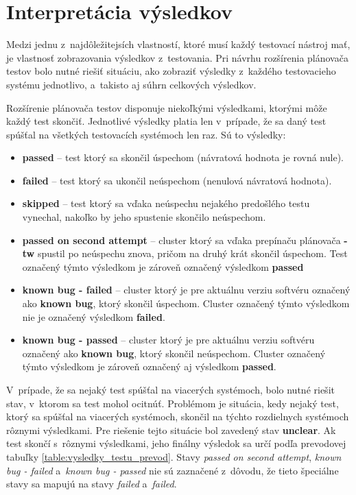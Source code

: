 \section{Interpretácia výsledkov}
\label{sekcia:interpretacia_vysledkov}
Medzi jednu z~najdôležitejsích vlastností, ktoré musí každý testovací nástroj mať, je vlastnosť zobrazovania výsledkov z~testovania.
Pri návrhu rozšírenia plánovača testov bolo nutné riešiť situáciu, ako zobraziť výsledky z~každého testovacieho systému jednotlivo,
a~takisto aj súhrn celkových výsledkov. 

Rozšírenie plánovača testov disponuje niekoľkými výsledkami, ktorými môže každý test skončiť. 
Jednotlivé výsledky platia len v~prípade, že sa daný test spúšťal na všetkých testovacích systémoch len raz. Sú to výsledky:
\begin{itemize}
\item \textbf{passed} -- test ktorý sa skončil úspechom (návratová hodnota je rovná nule).
\item \textbf{failed} -- test ktorý sa ukončil neúspechom (nenulová návratová hodnota).
\item \textbf{skipped} -- test ktorý sa vďaka neúspechu nejakého predošlého testu vynechal, nakoľko by jeho spustenie skončilo neúspechom.
\item \textbf{passed on second attempt} -- cluster ktorý sa vďaka prepínaču plánovača \textbf{-tw} spustil po neúspechu znova, pričom na druhý
krát skončil úspechom. Test označený týmto výsledkom je zároveň označený výsledkom \textbf{passed}
\item \textbf{known bug - failed} -- cluster ktorý je pre aktuálnu verziu softvéru označený ako \textbf{known bug}, ktorý skončil úspechom. 
Cluster označený týmto výsledkom nie je označený výsledkom \textbf{failed}.
\item \textbf{known bug - passed} -- cluster ktorý je pre aktuálnu verziu softvéru označený ako \textbf{known bug}, ktorý skončil neúspechom.
Cluster označený týmto výsledkom je zároveň označený aj výsledkom \textbf{passed}.
\end{itemize} 

V~prípade, že sa nejaký test spúšťal na viacerých systémoch, bolo nutné riešit stav, v~ktorom sa test mohol ocitnúť. 
Problémom je situácia, kedy nejaký test, ktorý sa spúšťal na viacerých systémoch, skončil na týchto rozdielnych systémoch rôznymi výsledkami.
Pre riešenie tejto situácie bol zavedený stav \textbf{unclear}. 
Ak test skončí s~rôznymi výsledkami, jeho finálny výsledok sa určí podľa prevodovej tabuľky \ref{table:vysledky_testu_prevod}.
Stavy \emph{passed on second attempt}, \emph{known bug - failed}
a~\emph{known bug - passed} nie sú zaznačené z~dôvodu, že tieto špeciálne stavy sa mapujú na stavy \emph{failed} a~\emph{failed}.

